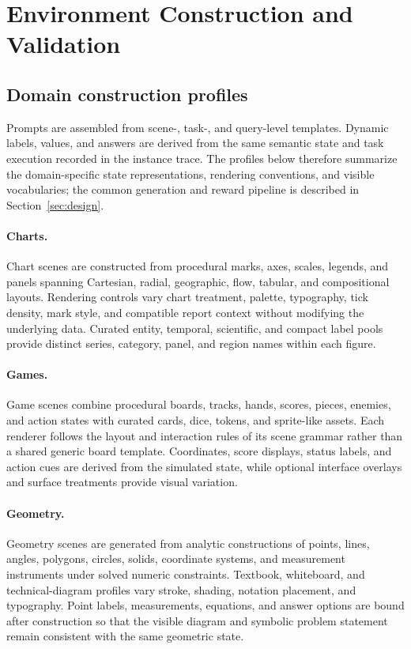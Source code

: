 \section{Environment Construction and Validation}
\label{app:generation}

\subsection{Domain construction profiles}

Prompts are assembled from scene-, task-, and query-level templates. Dynamic
labels, values, and answers are derived from the same semantic state and task
execution recorded in the instance trace. The profiles below therefore
summarize the domain-specific state representations, rendering conventions,
and visible vocabularies; the common generation and reward pipeline is
described in Section~\ref{sec:design}.

\paragraph{Charts.}
Chart scenes are constructed from procedural marks, axes, scales, legends, and
panels spanning Cartesian, radial, geographic, flow, tabular, and compositional
layouts. Rendering controls vary chart treatment, palette, typography, tick
density, mark style, and compatible report context without modifying the
underlying data. Curated entity, temporal, scientific, and compact label pools
provide distinct series, category, panel, and region names within each figure.

\paragraph{Games.}
Game scenes combine procedural boards, tracks, hands, scores, pieces, enemies,
and action states with curated cards, dice, tokens, and sprite-like assets.
Each renderer follows the layout and interaction rules of its scene grammar
rather than a shared generic board template. Coordinates, score displays,
status labels, and action cues are derived from the simulated state, while
optional interface overlays and surface treatments provide visual variation.

\paragraph{Geometry.}
Geometry scenes are generated from analytic constructions of points, lines,
angles, polygons, circles, solids, coordinate systems, and measurement
instruments under solved numeric constraints. Textbook, whiteboard, and
technical-diagram profiles vary stroke, shading, notation placement, and
typography. Point labels, measurements, equations, and answer options are bound
after construction so that the visible diagram and symbolic problem statement
remain consistent with the same geometric state.

